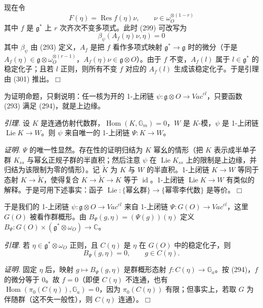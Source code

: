 现在令
\begin{equation}\tag{300}
F(\eta)=\operatorname{Res}f(\eta)\nu,\qquad \nu\in\omega_O^{\otimes(1-r)}
\end{equation}
其中 $f$ 是 $\mathfrak{g}^*$ 上 $r$ 次齐次不变多项式。此时 (299) 可改写为
\begin{equation}\tag{301}
\beta_\psi(A_f(\eta)\nu,\eta)=0
\end{equation}
其中 $\beta_\psi$ 由 (293) 定义，$A_f$ 是把 $f$ 看作多项式映射 $\mathfrak{g}^*\to\mathfrak{g}$ 时的微分（于是 $A_f(\eta)\in\mathfrak{g}\otimes\omega_O^{\otimes(r-1)}$，$A_f(\eta)\nu\in\mathfrak{g}\otimes O$）。由于 $f$ 不变，$A_f(l)$ 属于 $l\in\mathfrak{g}^*$ 的稳定化子；且若 $l$ 正则，则所有不变 $f$ 对应的 $A_f(l)$ 生成该稳定化子。于是引理由 (301) 推出。\hfill$\Box$

为证明命题，只剩说明：任一核为开的 1-上闭链 $\psi:\mathfrak{g}\otimes O\to\mathit{Vac}^{cl}$，只要函数 (293) 满足 (294)，就是上边缘。


\emph{引理.} 设 $K$ 是连通仿射代数群，$\operatorname{Hom}(K,\mathbb{G}_m)=0$，$W$ 是 $K$-模，$\psi$ 是 1-上闭链 $\operatorname{Lie}K\to W$。则 $\psi$ 来自唯一的 1-上闭链 $\Psi:K\to W$。

\emph{证明.} $\Psi$ 的唯一性显然。存在性的证明归结为 $K$ 幂幺的情形（把 $K$ 表示成半单子群 $K_{ss}$ 与幂幺正规子群的半直积；然后注意 $\psi$ 在 $\operatorname{Lie}K_{ss}$ 上的限制是上边缘，并归结为该限制为零的情形）。记 $\tilde K$ 为 $K$ 与 $W$ 的半直积。1-上闭链 $K\to W$ 等同于态射 $K\to\tilde K$，使得复合 $K\to\tilde K\to K$ 等于 $\operatorname{id}$。1-上闭链 $\operatorname{Lie}K\to W$ 有类似的解释。于是可用下述事实：函子 $\operatorname{Lie}:\{\text{幂幺群}\}\to\{\text{幂零李代数}\}$ 是等价。\hfill$\Box$

于是我们的 1-上闭链 $\psi:\mathfrak{g}\otimes O\to\mathit{Vac}^{cl}$ 来自 1-上闭链 $\Psi:G(O)\to\mathit{Vac}^{cl}$，这里 $G(O)$ 被看作群概形。由 $B_\Psi(g,\eta)=(\Psi(g))(\eta)$ 定义 $B_\Psi:G(O)\times(\mathfrak{g}^*\otimes\omega_O)\to\mathbb{C}$。

\emph{引理.} 若 $\eta\in\mathfrak{g}^*\otimes\omega_O$ 正则，且 $C(\eta)$ 是 $\eta$ 在 $G(O)$ 中的稳定化子，则
\begin{equation}\tag{302}
B_\Psi(g,\eta)=0,\qquad g\in C(\eta).
\end{equation}

\emph{证明.} 固定 $\eta$ 后，映射 $g\mapsto B_\Psi(g,\eta)$ 是群概形态射 $f:C(\eta)\to\mathbb{G}_a$。按 (294)，$f$ 的微分等于 $0$。故 $f=0$（即便 $C(\eta)$ 不连通，也有 $\operatorname{Hom}(\pi_0(C(\eta)),\mathbb{G}_a)=0$，因为 $\pi_0(C(\eta))$ 有限；但事实上，若取 $G$ 为伴随群（这不失一般性），则 $C(\eta)$ 连通）。\hfill$\Box$

